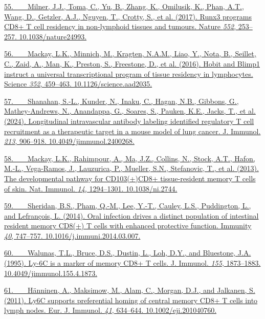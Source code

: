 \href{https://sciwheel.com/work/bibliography/4577165}{55.~  Milner,
J.J., Toma, C., Yu, B., Zhang, K., Omilusik, K., Phan, A.T., Wang, D.,
Getzler, A.J., Nguyen, T., Crotty, S., et al. (2017). Runx3 programs
CD8+ T cell residency in non-lymphoid tissues and tumours. Nature
\emph{552}, 253--257. 10.1038/nature24993.}

\href{https://sciwheel.com/work/bibliography/1395264}{56.~  Mackay,
L.K., Minnich, M., Kragten, N.A.M., Liao, Y., Nota, B., Seillet, C.,
Zaid, A., Man, K., Preston, S., Freestone, D., et al. (2016). Hobit and
Blimp1 instruct a universal transcriptional program of tissue residency
in lymphocytes. Science \emph{352}, 459--463. 10.1126/science.aad2035.}

\href{https://sciwheel.com/work/bibliography/16725712}{57.~  Shanahan,
S.-L., Kunder, N., Inaku, C., Hagan, N.B., Gibbons, G., Mathey-Andrews,
N., Anandappa, G., Soares, S., Pauken, K.E., Jacks, T., et al. (2024).
Longitudinal intravascular antibody labeling identified regulatory T
cell recruitment as a therapeutic target in a mouse model of lung
cancer. J. Immunol. \emph{213}, 906--918. 10.4049/jimmunol.2400268.}

\href{https://sciwheel.com/work/bibliography/1028483}{58.~  Mackay,
L.K., Rahimpour, A., Ma, J.Z., Collins, N., Stock, A.T., Hafon, M.-L.,
Vega-Ramos, J., Lauzurica, P., Mueller, S.N., Stefanovic, T., et al.
(2013). The developmental pathway for CD103(+)CD8+ tissue-resident
memory T cells of skin. Nat. Immunol. \emph{14}, 1294--1301. 10.1038/ni.2744.}

\href{https://sciwheel.com/work/bibliography/1307038}{59.~  Sheridan,
B.S., Pham, Q.-M., Lee, Y.-T., Cauley, L.S., Puddington, L., and
Lefrançois, L. (2014). Oral infection drives a distinct population of
intestinal resident memory CD8(+) T cells with enhanced protective
function. Immunity \emph{40}, 747--757. 10.1016/j.immuni.2014.03.007.}

\href{https://sciwheel.com/work/bibliography/10765999}{60.~  Walunas,
T.L., Bruce, D.S., Dustin, L., Loh, D.Y., and Bluestone, J.A. (1995).
Ly-6C is a marker of memory CD8+ T cells. J. Immunol. \emph{155},
1873--1883. 10.4049/jimmunol.155.4.1873.}

\href{https://sciwheel.com/work/bibliography/9105104}{61.~  Hänninen,
A., Maksimow, M., Alam, C., Morgan, D.J., and Jalkanen, S. (2011). Ly6C
supports preferential homing of central memory CD8+ T cells into lymph
nodes. Eur. J. Immunol. \emph{41}, 634--644. 10.1002/eji.201040760.}

